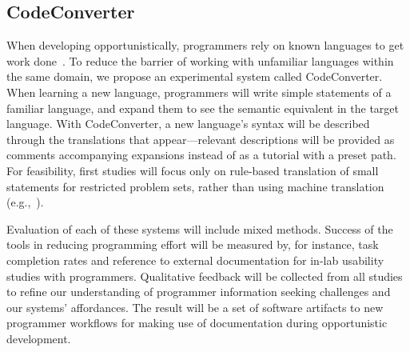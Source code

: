 \documentclass[12pt]{memoir}
\begin{document}
\subsection{CodeConverter}
When developing opportunistically, programmers rely on known languages to get work done~\cite{brandt_opportunistic_2008}.
To reduce the barrier of working with unfamiliar languages within the same domain, we propose an experimental system called CodeConverter.
When learning a new language, programmers will write simple statements of a familiar language, and expand them to see the semantic equivalent in the target language.
With CodeConverter, a new language's syntax will be described through the translations that appear---relevant descriptions will be provided as comments accompanying expansions instead of as a tutorial with a preset path.
For feasibility, first studies will focus only on rule-based translation of small statements for restricted problem sets, rather than using machine translation (e.g.,~\cite{karaivanov_phrase-based_2014}).

Evaluation of each of these systems will include mixed methods.
Success of the tools in reducing programming effort will be measured by, for instance, task completion rates and reference to external documentation for in-lab usability studies with programmers.
Qualitative feedback will be collected from all studies to refine our understanding of programmer information seeking challenges and our systems' affordances.
The result will be a set of software artifacts to new programmer workflows for making use of documentation during opportunistic development.
\end{document}
